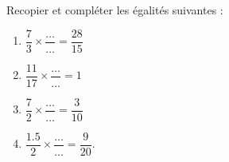 
\begin{exercice}\label{exosmath-0876}

    Recopier et compléter les égalités suivantes :
    \begin{multicols}{2}
        \begin{enumerate}
            \item
                \( \dfrac{ 7 }{ 3 }\times \dfrac{ \ldots }{ \ldots }=\dfrac{ 28 }{ 15 }\) 
            \item
                \( \dfrac{ 11 }{ 17 }\times \dfrac{ \ldots }{ \ldots }=1\) 
            \item
                \( \dfrac{ 7 }{ 2 }\times \dfrac{ \ldots }{ \ldots }=\dfrac{ 3 }{ 10 }\) 
            \item
                \( \dfrac{ 1.5 }{ 2 }\times \dfrac{ \ldots }{ \ldots }=\dfrac{ 9 }{ 20 }\). 
        \end{enumerate}
    \end{multicols}

\end{exercice}
